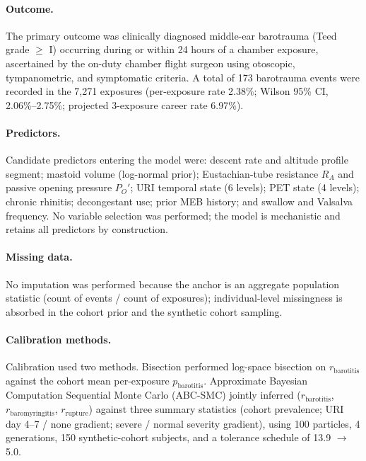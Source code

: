 \documentclass[11pt,a4paper]{article}
\begin{document}
\paragraph{Outcome.}
The primary outcome was clinically diagnosed middle-ear barotrauma (Teed grade $\geq$ I) occurring during or within 24 hours of a chamber exposure, ascertained by the on-duty chamber flight surgeon using otoscopic, tympanometric, and symptomatic criteria. A total of 173 barotrauma events were recorded in the 7,271 exposures (per-exposure rate 2.38\%; Wilson 95\% CI, 2.06\%--2.75\%; projected 3-exposure career rate 6.97\%).

\paragraph{Predictors.}
Candidate predictors entering the model were: descent rate and altitude profile segment; mastoid volume (log-normal prior); Eustachian-tube resistance $R_A$ and passive opening pressure $P_O'$; URI temporal state (6 levels); PET state (4 levels); chronic rhinitis; decongestant use; prior MEB history; and swallow and Valsalva frequency. No variable selection was performed; the model is mechanistic and retains all predictors by construction.

\paragraph{Missing data.}
No imputation was performed because the anchor is an aggregate population statistic (count of events / count of exposures); individual-level missingness is absorbed in the cohort prior and the synthetic cohort sampling.

\paragraph{Calibration methods.}
Calibration used two methods. Bisection performed log-space bisection on $r_{\mathrm{barotitis}}$ against the cohort mean per-exposure $p_{\mathrm{barotitis}}$. Approximate Bayesian Computation Sequential Monte Carlo (ABC-SMC) \citep{Toni2009} jointly inferred ($r_{\mathrm{barotitis}}$, $r_{\mathrm{baromyringitis}}$, $r_{\mathrm{rupture}}$) against three summary statistics (cohort prevalence; URI day 4--7 / none gradient; severe / normal severity gradient), using 100 particles, 4 generations, 150 synthetic-cohort subjects, and a tolerance schedule of 13.9 $\rightarrow$ 5.0.
\end{document}
